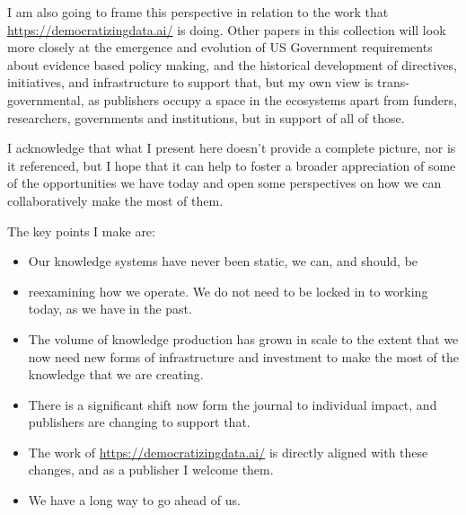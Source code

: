 \documentclass[]{hdsr}
\begin{document}
I am also going to frame this perspective in relation to the work that \href{}{https://democratizingdata.ai/} is doing. Other papers in this collection will look more closely at the emergence and evolution of US Government requirements about evidence based policy making, and the historical development of directives, initiatives, and infrastructure to support that, but my own view is trans-governmental, as publishers occupy a space in the ecosystems apart from funders, researchers, governments and institutions, but in support of all of those.

I acknowledge that what I present here doesn't provide a complete picture, nor is it referenced, but I hope that it can help to foster a broader appreciation of some of the opportunities we have today and open some perspectives on how we can collaboratively make the most of them.

The key points I make are:
    \begin{itemize}
        \item Our knowledge systems have never been static, we can, and should, be
        \item reexamining how we operate. We do not need to be locked in to working today, as we have in the past.
    \end{itemize}
    \begin{itemize}
        \item The volume of knowledge production has grown in scale to the extent that we now need new forms of infrastructure and investment to make the most of the knowledge that we are creating.
        \item There is a significant shift now form the journal to individual impact, and publishers are changing to support that.
        \item The work of \href{https://democratizingdata.ai/}{https://democratizingdata.ai/} is directly aligned with these changes, and as a publisher I welcome them.
        \item We have a long way to go ahead of us.
    \end{itemize}
\end{document}
